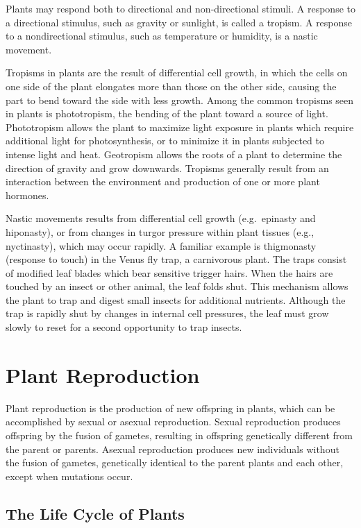 Plants may respond both to directional and non-directional stimuli. A response to a directional stimulus, such as gravity or sunlight, is called a tropism. A response to a nondirectional stimulus, such as temperature or humidity, is a nastic movement.

Tropisms in plants are the result of differential cell growth, in which the cells on one side of the plant elongates more than those on the other side, causing the part to bend toward the side with less growth. Among the common tropisms seen in plants is phototropism, the bending of the plant toward a source of light. Phototropism allows the plant to maximize light exposure in plants which require additional light for photosynthesis, or to minimize it in plants subjected to intense light and heat. Geotropism allows the roots of a plant to determine the direction of gravity and grow downwards. Tropisms generally result from an interaction between the environment and production of one or more plant hormones.

Nastic movements results from differential cell growth (e.g.~epinasty and hiponasty), or from changes in turgor pressure within plant tissues (e.g., nyctinasty), which may occur rapidly. A familiar example is thigmonasty (response to touch) in the Venus fly trap, a carnivorous plant. The traps consist of modified leaf blades which bear sensitive trigger hairs. When the hairs are touched by an insect or other animal, the leaf folds shut. This mechanism allows the plant to trap and digest small insects for additional nutrients. Although the trap is rapidly shut by changes in internal cell pressures, the leaf must grow slowly to reset for a second opportunity to trap insects.

\hypertarget{plant-reproduction}{%
\section{Plant Reproduction}\label{plant-reproduction}}

Plant reproduction is the production of new offspring in plants, which can be accomplished by sexual or asexual reproduction. Sexual reproduction produces offspring by the fusion of gametes, resulting in offspring genetically different from the parent or parents. Asexual reproduction produces new individuals without the fusion of gametes, genetically identical to the parent plants and each other, except when mutations occur.

\hypertarget{the-life-cycle-of-plants}{%
\subsection{The Life Cycle of Plants}\label{the-life-cycle-of-plants}}

